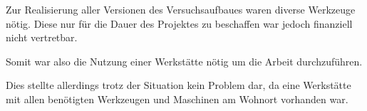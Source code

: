 Zur Realisierung aller Versionen des Versuchsaufbaues waren diverse Werkzeuge nötig.
Diese nur für die Dauer des Projektes zu beschaffen war jedoch finanziell nicht vertretbar.

Somit war also die Nutzung einer Werkstätte nötig um die Arbeit durchzuführen.

Dies stellte allerdings trotz der Situation kein Problem dar, da eine Werkstätte mit allen benötigten Werkzeugen und Maschinen am Wohnort vorhanden war.